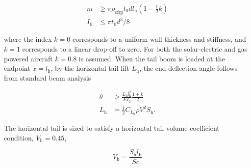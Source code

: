 \begin{align}
    m &\geq \pi \rho_{\text{cfrp}} t_0 d l_{\text{h}} \left( 1 - \frac{1}{2} k\right) \\
    I_0 &\leq \pi t_0 d^3/8
\end{align}

where the index $k=0$ corresponds to a uniform wall thickness and stiffness, and $k=1$ corresponds to a linear drop-off to zero.  For both the solar-electric and gas powered aircraft $k=0.8$ is assumed.  
When the tail boom is loaded at the endpoint $x=l_{\text{h}}$, by the horizontal tail lift $L_{\text{h}}$, the end deflection angle follows from standard beam analysis

\begin{align}
    \label{e:boomdefl}
    \theta &\geq \frac{L_{\text{h}} l_{\text{h}}^2}{EI_0} \frac{1+k}{2} \\
    L_{\text{h}} &= \frac{1}{2} C_{L_{\text{h}}} \rho V^2 S_{\text{h}}.
\end{align}

The horizontal tail is sized to satisfy a horizontal tail volume coefficient condition, $V_{\text{h}} = 0.45$,\cite{aircraftrules}

\begin{equation}
    V_{\text{h}} = \frac{S_{\text{h}}l_{\text{h}}}{Sc}
\end{equation}

